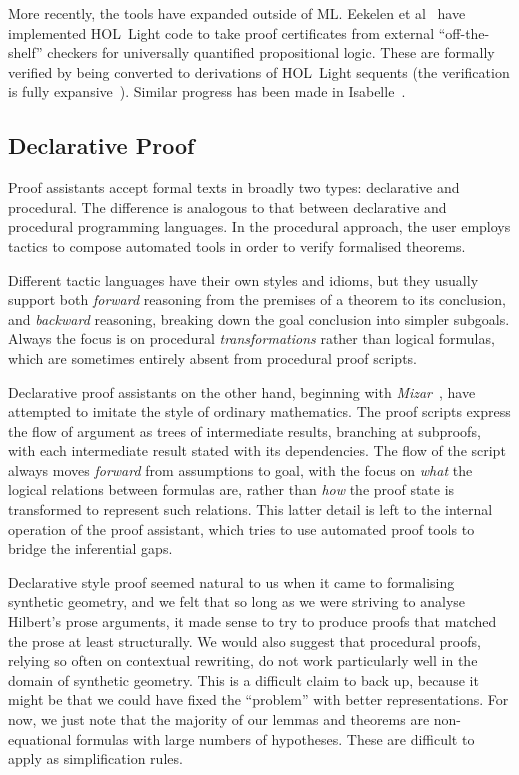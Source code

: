 More recently, the tools have expanded outside of ML. Eekelen et al~\cite{HOLLightBoolean} have implemented HOL~Light code to take proof certificates from external ``off-the-shelf'' checkers for universally quantified propositional logic. These are formally verified by being converted to derivations of HOL~Light sequents (the verification is fully expansive~\cite{FullyExpansive}). Similar progress has been made in Isabelle~\cite{IsabelleSledgehammer}.

\subsection{Declarative Proof}\label{sec:DeclarativeProof}
Proof assistants accept formal texts in broadly two types: declarative and procedural. The difference is analogous to that between declarative and procedural programming languages. In the procedural approach, the user employs tactics to compose automated tools in order to verify formalised theorems. 

Different tactic languages have their own styles and idioms, but they usually support both \emph{forward} reasoning from the premises of a theorem to its conclusion, and \emph{backward} reasoning, breaking down the goal conclusion into simpler subgoals. Always the focus is on procedural \emph{transformations} rather than logical formulas, which are sometimes entirely absent from procedural proof scripts.

Declarative proof assistants on the other hand, beginning with \emph{Mizar}~\cite{MizarMathematicalVernacular}, have attempted to imitate the style of ordinary mathematics. The proof scripts express the flow of argument as trees of intermediate results, branching at subproofs, with each intermediate result stated with its dependencies. The flow of the script always moves \emph{forward} from assumptions to goal, with the focus on \emph{what} the logical relations between formulas are, rather than \emph{how} the proof state is transformed to represent such relations. This latter detail is left to the internal operation of the proof assistant, which tries to use automated proof tools to bridge the inferential gaps.

Declarative style proof seemed natural to us when it came to formalising synthetic geometry, and we felt that so long as we were striving to analyse Hilbert's prose arguments, it made sense to try to produce proofs that matched the prose at least structurally. We would also suggest that procedural proofs, relying so often on contextual rewriting, do not work particularly well in the domain of synthetic geometry. This is a difficult claim to back up, because it might be that we could have fixed the ``problem'' with better representations. For now, we just note that the majority of our lemmas and theorems are non-equational formulas with large numbers of hypotheses. These are difficult to apply as simplification rules.

